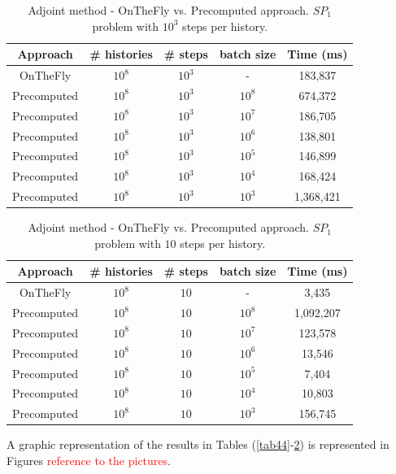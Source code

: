 \documentclass[a4paper,10pt]{article}
\begin{document}
\begin{table}[!h]
\hspace*{1.5cm}
\begin{tabular}{|c|c|c|c|c|}
\hline
\textbf{Approach} & \textbf{\# histories} &\textbf{\# steps} & \textbf{batch 
size} 
& \textbf{Time (ms)} \\
\hline
OnTheFly& $10^8$ & $10^3$ & - & 183,837 \\
\hline 
Precomputed& $10^8$ & $10^3$ & $10^8$ & 674,372\\
\hline
Precomputed& $10^8$ & $10^3$ & $10^7$ & 186,705\\
\hline
Precomputed& $10^8$ & $10^3$ & $10^6$ & 138,801\\
\hline
Precomputed& $10^8$ & $10^3$ & $10^5$ & 146,899\\
\hline
Precomputed& $10^8$ & $10^3$ & $10^4$ & 168,424\\
\hline
Precomputed& $10^8$ & $10^3$ & $10^3$ & 1,368,421\\
\hline
\end{tabular}
\caption{Adjoint method - OnTheFly vs. Precomputed approach. $SP_1$ problem 
with $10^3$ steps per history.} 
\label{tab46}
\end{table}


\begin{table}[!h]
\hspace*{1.5cm}
\begin{tabular}{|c|c|c|c|c|}
\hline
\textbf{Approach} & \textbf{\# histories} &\textbf{\# steps} & \textbf{batch 
size} 
& \textbf{Time (ms)} \\
\hline
OnTheFly& $10^8$ & $10$ & - & 3,435 \\
\hline 
Precomputed& $10^8$ & $10$ & $10^8$ & 1,092,207\\
\hline
Precomputed& $10^8$ & $10$ & $10^7$ & 123,578\\
\hline
Precomputed& $10^8$ & $10$ & $10^6$ & 13,546\\
\hline
Precomputed& $10^8$ & $10$ & $10^5$ & 7,404\\
\hline
Precomputed& $10^8$ & $10$ & $10^4$ & 10,803\\
\hline
Precomputed& $10^8$ & $10$ & $10^3$ & 156,745\\
\hline
\end{tabular}
\caption{Adjoint method - OnTheFly vs. Precomputed approach. $SP_1$ problem 
with $10$ steps per history.} 
\label{tab47}
\end{table}


A graphic representation of the results in Tables (\ref{tab44}-\ref{tab47}) is 
represented in Figures \textcolor{red}{reference to the pictures}.
\end{document}
